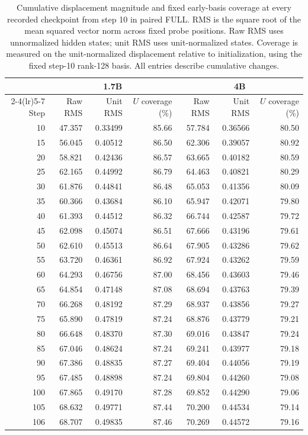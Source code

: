 \begin{table}[!htbp]
\centering
\caption{Cumulative displacement magnitude and fixed early-basis coverage at every recorded checkpoint from step 10 in paired FULL. RMS is the square root of the mean squared vector norm across fixed probe positions. Raw RMS uses unnormalized hidden states; unit RMS uses unit-normalized states. Coverage is measured on the unit-normalized displacement relative to initialization, using the fixed step-10 rank-128 basis. All entries describe cumulative changes.}
\label{tab:cumulative_motion_audit}
\small\setlength{\tabcolsep}{8pt}
\begin{tabular}{rrrrrrr}
\toprule
 & \multicolumn{3}{c}{1.7B} & \multicolumn{3}{c}{4B} \\
\cmidrule(lr){2-4}\cmidrule(lr){5-7}
Step & Raw RMS & Unit RMS & $U$ coverage (\%) & Raw RMS & Unit RMS & $U$ coverage (\%) \\
\midrule
10 & 47.357 & 0.33499 & 85.66 & 57.784 & 0.36566 & 80.50 \\
15 & 56.045 & 0.40512 & 86.50 & 62.306 & 0.39057 & 80.92 \\
20 & 58.821 & 0.42436 & 86.57 & 63.665 & 0.40182 & 80.59 \\
25 & 62.165 & 0.44992 & 86.79 & 64.463 & 0.40821 & 80.29 \\
30 & 61.876 & 0.44841 & 86.48 & 65.053 & 0.41356 & 80.09 \\
35 & 60.366 & 0.43684 & 86.10 & 65.947 & 0.42071 & 79.80 \\
40 & 61.393 & 0.44512 & 86.32 & 66.744 & 0.42587 & 79.72 \\
45 & 62.098 & 0.45074 & 86.51 & 67.666 & 0.43196 & 79.61 \\
50 & 62.610 & 0.45513 & 86.64 & 67.905 & 0.43286 & 79.62 \\
55 & 63.720 & 0.46361 & 86.92 & 67.924 & 0.43262 & 79.59 \\
60 & 64.293 & 0.46756 & 87.00 & 68.456 & 0.43603 & 79.46 \\
65 & 64.854 & 0.47148 & 87.08 & 68.694 & 0.43763 & 79.39 \\
70 & 66.268 & 0.48192 & 87.29 & 68.937 & 0.43856 & 79.27 \\
75 & 65.890 & 0.47819 & 87.24 & 68.876 & 0.43779 & 79.21 \\
80 & 66.648 & 0.48370 & 87.30 & 69.016 & 0.43847 & 79.24 \\
85 & 67.046 & 0.48624 & 87.24 & 69.241 & 0.43977 & 79.18 \\
90 & 67.386 & 0.48835 & 87.27 & 69.404 & 0.44056 & 79.19 \\
95 & 67.485 & 0.48898 & 87.24 & 69.804 & 0.44260 & 79.08 \\
100 & 67.865 & 0.49170 & 87.28 & 69.852 & 0.44290 & 79.06 \\
105 & 68.632 & 0.49771 & 87.44 & 70.200 & 0.44534 & 79.14 \\
106 & 68.707 & 0.49835 & 87.46 & 70.269 & 0.44572 & 79.16 \\
\bottomrule
\end{tabular}
\end{table}
